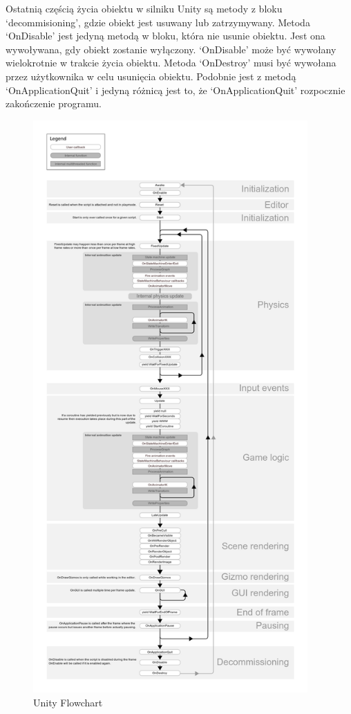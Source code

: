 \documentclass[12pt,twoside]{article}
\begin{document}
Ostatnią częścią życia obiektu w silniku Unity są metody z bloku
‘decommisioning’, gdzie obiekt jest usuwany lub zatrzymywany. Metoda ‘OnDisable’
jest jedyną metodą w bloku, która nie usunie obiektu. Jest ona wywoływana, gdy
obiekt zostanie wyłączony. ‘OnDisable’ może być wywołany wielokrotnie w trakcie
życia obiektu. Metoda ‘OnDestroy’ musi być wywołana przez użytkownika w celu
usunięcia obiektu. Podobnie jest z metodą ‘OnApplicationQuit’ i jedyną różnicą
jest to, że ‘OnApplicationQuit’ rozpocznie zakończenie programu. 




\begin{figure}[ht]
    \centering
    \includegraphics[width=10.5cm]{figures/UnityFlowchart.png}
    \caption{Unity Flowchart\cite{Unity:Flowchart}}
    \label{Unity:FlowchartFIG}
\end{figure}
\end{document}
